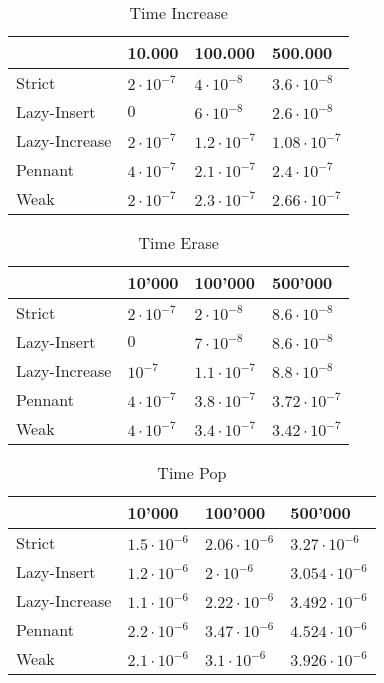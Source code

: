 \documentclass{DIKU-article}[2010/01/13]
\begin{document}
\begin{table}[h!]
\centering
\caption{Time Increase}
\begin{tabular}{l|lll}
 & 10.000 & 100.000 & 500.000 \\
\hline
Strict & $2\cdot 10^{-7}$ & $4\cdot 10^{-8}$ & $3.6\cdot 10^{-8}$\\
Lazy-Insert & $0$ & $6\cdot 10^{-8}$ & $2.6\cdot 10^{-8}$\\
Lazy-Increase & $2\cdot 10^{-7}$ & $1.2\cdot 10^{-7}$ & $1.08\cdot 10^{-7}$\\
Pennant & $4\cdot 10^{-7}$ & $2.1\cdot 10^{-7}$ & $2.4\cdot 10^{-7}$\\
Weak & $2\cdot 10^{-7}$ & $2.3\cdot 10^{-7}$ & $2.66\cdot 10^{-7}$

\end{tabular}
\end{table}

\begin{table}[h!]
\centering
\caption{Time Erase}
\begin{tabular}{l|lll}
 & 10'000 & 100'000 & 500'000 \\
\hline
Strict & $2\cdot 10^{-7}$ & $2\cdot 10^{-8}$ & $8.6\cdot 10^{-8}$\\
Lazy-Insert & $0$ & $7\cdot 10^{-8}$ & $8.6\cdot 10^{-8}$\\
Lazy-Increase & $10^{-7}$ & $1.1\cdot 10^{-7}$ & $8.8\cdot 10^{-8}$\\
Pennant & $4\cdot 10^{-7}$ & $3.8\cdot 10^{-7}$ & $3.72\cdot 10^{-7}$\\
Weak & $4\cdot 10^{-7}$ & $3.4\cdot 10^{-7}$ & $3.42\cdot 10^{-7}$

\end{tabular}
\end{table}

\begin{table}[h!]
\centering
\caption{Time Pop}
\begin{tabular}{l|lll}
  & 10'000 & 100'000 & 500'000 \\
  \hline
  Strict & $1.5\cdot 10^{-6}$ & $2.06\cdot 10^{-6}$ & $3.27\cdot 10^{-6}$\\
  Lazy-Insert & $1.2\cdot 10^{-6}$ & $2\cdot 10^{-6}$ & $3.054\cdot 10^{-6}$\\
  Lazy-Increase & $1.1\cdot 10^{-6}$ & $2.22\cdot 10^{-6}$ & $3.492\cdot 10^{-6}$\\
  Pennant & $2.2\cdot 10^{-6}$ & $3.47\cdot 10^{-6}$ & $4.524\cdot 10^{-6}$\\
  Weak & $2.1\cdot 10^{-6}$ & $3.1\cdot 10^{-6}$ & $3.926\cdot 10^{-6}$

\end{tabular}
\end{table}
\end{document}
